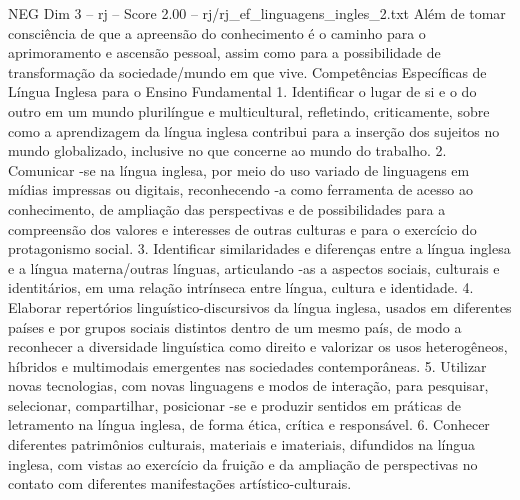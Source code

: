 \begin{textsample}{NEG Dim 3 – rj – Score 2.00 – rj/rj\_ef\_linguagens\_ingles\_2.txt}
Além de tomar consciência de que a apreensão do conhecimento é o caminho para o aprimoramento e ascensão pessoal, assim como para a possibilidade de transformação da sociedade/mundo em que vive.
Competências Específicas de Língua Inglesa para o Ensino Fundamental 1.
Identificar o lugar de si e o do outro em um mundo plurilíngue e multicultural, refletindo, criticamente, sobre como a aprendizagem da língua inglesa contribui para a inserção dos sujeitos no mundo globalizado, inclusive no que concerne ao mundo do trabalho. 2.
Comunicar -se na língua inglesa, por meio do uso variado de linguagens em mídias impressas ou digitais, reconhecendo -a como ferramenta de acesso ao conhecimento, de ampliação das perspectivas e de possibilidades para a compreensão dos valores e interesses de outras culturas e para o exercício do protagonismo social. 3.
Identificar similaridades e diferenças entre a língua inglesa e a língua materna/outras línguas, articulando -as a aspectos sociais, culturais e identitários, em uma relação intrínseca entre língua, cultura e identidade. 4.
Elaborar repertórios linguístico-discursivos da língua inglesa, usados em diferentes países e por grupos sociais distintos dentro de um mesmo país, de modo a reconhecer a diversidade linguística como direito e valorizar os usos heterogêneos, híbridos e multimodais emergentes nas sociedades contemporâneas. 5.
Utilizar novas tecnologias, com novas linguagens e modos de interação, para pesquisar, selecionar, compartilhar, posicionar -se e produzir sentidos em práticas de letramento na língua inglesa, de forma ética, crítica e responsável. 6.
Conhecer diferentes patrimônios culturais, materiais e imateriais, difundidos na língua inglesa, com vistas ao exercício da fruição e da ampliação de perspectivas no contato com diferentes manifestações artístico-culturais.

\end{textsample}
